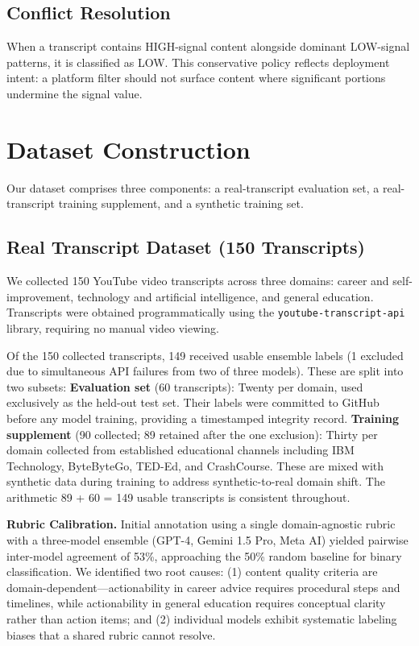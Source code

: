 \documentclass[11pt,a4paper]{article}
\begin{document}
\subsection{Conflict Resolution}

When a transcript contains HIGH-signal content alongside dominant LOW-signal patterns, it is
classified as LOW. This conservative policy reflects deployment intent: a platform filter should
not surface content where significant portions undermine the signal value.

\section{Dataset Construction}

Our dataset comprises three components: a real-transcript evaluation set, a real-transcript
training supplement, and a synthetic training set.

\subsection{Real Transcript Dataset (150 Transcripts)}

We collected 150 YouTube video transcripts across three domains: career and self-improvement,
technology and artificial intelligence, and general education. Transcripts were obtained
programmatically using the \texttt{youtube-transcript-api} library, requiring no manual video
viewing.

Of the 150 collected transcripts, 149 received usable ensemble labels (1 excluded due to
simultaneous API failures from two of three models). These are split into two subsets:
\textbf{Evaluation set} (60 transcripts): Twenty per domain, used exclusively as the held-out
test set. Their labels were committed to GitHub before any model training, providing a
timestamped integrity record. \textbf{Training supplement} (90 collected; 89 retained after the
one exclusion): Thirty per domain collected from established educational channels including IBM
Technology, ByteByteGo, TED-Ed, and CrashCourse. These are mixed with synthetic data during
training to address synthetic-to-real domain shift. The arithmetic 89 + 60 = 149 usable
transcripts is consistent throughout.

\textbf{Rubric Calibration.} Initial annotation using a single domain-agnostic rubric with a
three-model ensemble (GPT-4, Gemini 1.5 Pro, Meta AI) yielded pairwise inter-model agreement of
53\%, approaching the 50\% random baseline for binary classification. We identified two root
causes: (1) content quality criteria are domain-dependent---actionability in career advice
requires procedural steps and timelines, while actionability in general education requires
conceptual clarity rather than action items; and (2) individual models exhibit systematic
labeling biases that a shared rubric cannot resolve.
\end{document}

